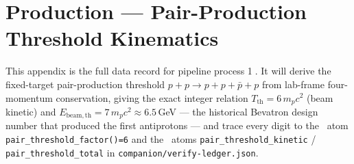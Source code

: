 \section{Production --- Pair-Production Threshold Kinematics}
\label{app:production}

This appendix is the full data record for pipeline process
\textcircled{\scriptsize 1}. It will derive the fixed-target
pair-production threshold $p+p\to p+p+\bar p+p$ from lab-frame
four-momentum conservation, giving the exact integer relation
$T_{\mathrm{th}}=6\,m_pc^2$ (beam kinetic) and $E_{\mathrm{beam,th}}=7\,m_pc^2
\approx 6.5$\,GeV --- the historical Bevatron design number that produced
the first antiprotons \citep{chamberlain1955} --- and trace every digit to
the \tierBlue\ atom \texttt{pair\_threshold\_factor()=6} and the
\tierGreen\ atoms \texttt{pair\_threshold\_kinetic} /
\texttt{pair\_threshold\_total} in \texttt{companion/verify-ledger.json}.

